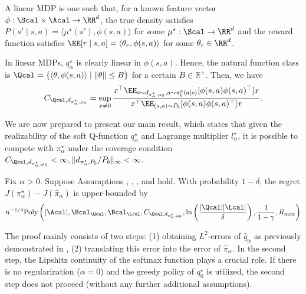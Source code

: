 \begin{example}
A linear MDP is one such that, for a known feature vector $\phi:\Scal \times \Acal \to \RR^d$, the true density satisfies $P(s' \mid s,a)=\langle \mu^{\star}(s'),\phi(s,a)\rangle $ for some $\mu^{\star}:\Scal \to \RR^d$ and the reward function satisfies $\EE[r\mid s,a]=\langle \theta_r, \phi(s,a) \rangle $ for some $\theta_r \in \RR^d$. 

In linear MDPs, $q^{\star}_{\alpha}$ is clearly linear in $\phi(s,a)$. Hence, the natural function class is $\Qcal=\{\langle \theta,\phi(s,a)\rangle \mid \|\theta\|\leq B\}$ for a certain $B\in \mathbb{R}^{+}$. Then, we have 
\begin{align*}
C_{\Qcal,d_{\pi^{\star}_{\alpha},\mu_0} }=\sup_{x\neq 0}\frac{x^{\top}\EE_{s \sim d_{\pi^{\star}_{\alpha},\mu_0}, a\sim \pi^{\diamond}_b(a\mid s) }[\phi(s,a)\phi(s,a)^{\top}]x  }{x^{\top}\EE_{(s,a)\sim P_b}[\phi(s,a)\phi(s,a)^{\top}]x}. 
\end{align*}
\end{example}


We are now prepared to present our main result, which states that given the realizability of the soft Q-function $q^{\star}_{\alpha}$ and Lagrange multiplier $l^{\star}_{\alpha}$, it is possible to compete with $\pi^{\star}_{\alpha}$ under the coverage condition $C_{\Qcal,d_{\pi^{\star}_{\alpha},\mu_0} }<\infty,\|d_{\pi^{\star}_{\alpha},P_b}/P_b\|_{\infty}<\infty $. 

\begin{theorem}\label{thm:main}
Fix $\alpha>0$. Suppose Assumptions , , , and  hold. 
With probability $1-\delta$, the regret $ J(\pi^{\star}_{\alpha})-J(\hat \pi_{\alpha})$  is upper-bounded by 
\begin{align*}
n^{-1/4}\mathrm{Poly}\left(|\Acal|,\Bcal_{\Qcal},\Bcal_{\Lcal},C_{\Qcal,d_{\pi^{\star}_{\alpha},\mu_0} }, \ln\left(\frac{|\Qcal||\Lcal|}{\delta}\right),\frac{1}{1-\gamma},R_{\max}\right)
\end{align*}

\end{theorem}
The proof mainly consists of two steps: (1) obtaining $L^2$-errors of $\hat q_{\alpha}$ as previously demonstrated in , (2) translating this error into the error of $\hat \pi_{\alpha}$. In the second step, the Lipshitz continuity of the softmax function plays a crucial role. If there is no regularization ($\alpha=0$) and the greedy policy of $q^{\star}_{0}$ is utilized, the second step does not proceed (without any further additional assumptions). 

